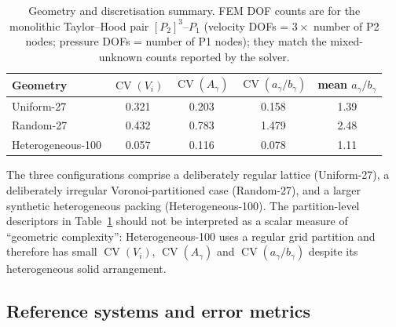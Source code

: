 \documentclass[11pt,a4paper]{article}
\newcommand{\cov}[1]{\operatorname{CV}\left(#1\right)}
\begin{document}
\begin{table}[t]
  \centering
  \footnotesize
  \caption{Geometry and discretisation summary.  FEM DOF counts are for
    the monolithic Taylor--Hood pair $[P_2]^3$--$P_1$ (velocity DOFs =
    $3\times$ number of P2 nodes; pressure DOFs = number of P1 nodes);
    they match the mixed-unknown counts reported by the solver.}
  \label{tab:geometry}
  \medskip
  \begin{tabular}{lcccc}
    \toprule
    Geometry & $\cov{V_i}$ & $\cov{A_\gamma}$ & $\cov{a_\gamma/b_\gamma}$ &
    mean $a_\gamma/b_\gamma$ \\
    \midrule
    Uniform-27 & 0.321 & 0.203 & 0.158 & 1.39 \\
    Random-27  & 0.432 & 0.783 & 1.479 & 2.48 \\
    Heterogeneous-100   & 0.057 & 0.116 & 0.078 & 1.11 \\
    \bottomrule
  \end{tabular}
\end{table}

The three configurations comprise a deliberately regular lattice
(Uniform-27), a deliberately irregular Voronoi-partitioned case
(Random-27), and a larger synthetic heterogeneous packing
(Heterogeneous-100).  The partition-level descriptors in
Table~\ref{tab:geometry} should not be interpreted as a scalar measure of
``geometric complexity'': Heterogeneous-100 uses a regular grid partition
and therefore has small $\cov{V_i}$, $\cov{A_\gamma}$ and
$\cov{a_\gamma/b_\gamma}$ despite its heterogeneous solid arrangement.

\subsection{Reference systems and error metrics}
\label{sec:references}
\end{document}
